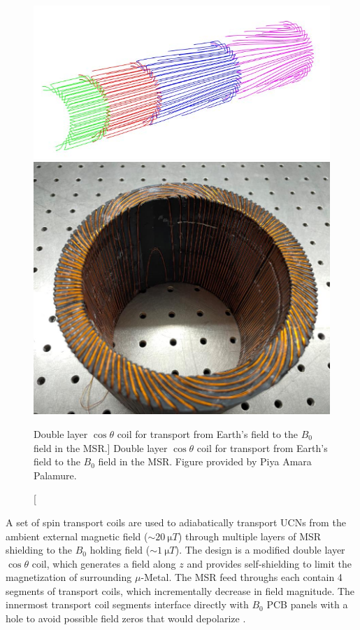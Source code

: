 \begin{figure}
\centering
\begin{minipage}{.5\textwidth}
    \centering
    \includegraphics[width=\textwidth]{figures/transport_coil_mockup.jpg}
\end{minipage}%
\begin{minipage}{.5\textwidth}
    \centering
    \includegraphics[width=\textwidth]{figures/transport_coil.jpg}
\end{minipage}
    \caption
    [Double layer $\cos\theta$ coil for transport from Earth's field to the $B_0$ field in the MSR.]
    {Double layer $\cos\theta$ coil for transport from Earth's field to the $B_0$ field in the MSR. Figure provided by Piya Amara Palamure.}
    \label{fig:transport-coils}
\end{figure}

A set of spin transport coils are used to adiabatically transport UCNs from the ambient external magnetic field ($\sim\qty{20}{\micro T}$) through multiple layers of MSR shielding to the $B_0$ holding field ($\sim\qty{1}{\micro T}$). The design is a modified double layer $\cos\theta$ coil, which generates a field along $z$ and provides self-shielding to limit the magnetization of surrounding $\mu$-Metal. The MSR feed throughs each contain 4 segments of transport coils, which incrementally decrease in field magnitude. The innermost transport coil segments interface directly with $B_0$ PCB panels with a hole to avoid possible field zeros that would depolarize \ucn. 

